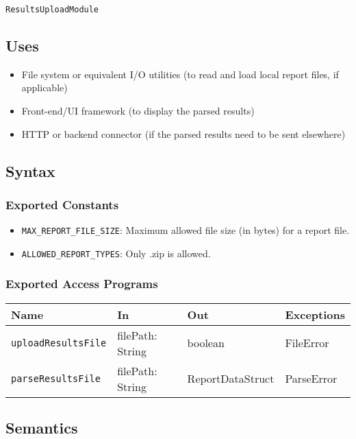 \documentclass[12pt, titlepage]{article}
\begin{document}
\texttt{ResultsUploadModule}

\subsection{Uses}

\begin{itemize}
    \item File system or equivalent I/O utilities (to read and load local report files, if applicable)
    \item Front-end/UI framework (to display the parsed results)
    \item HTTP or backend connector (if the parsed results need to be sent elsewhere)
\end{itemize}

\subsection{Syntax}

\subsubsection{Exported Constants}

\begin{itemize}
    \item \texttt{MAX\_REPORT\_FILE\_SIZE}: Maximum allowed file size (in bytes) for a report file.
    \item \texttt{ALLOWED\_REPORT\_TYPES}: Only .zip is allowed.
\end{itemize}

\subsubsection{Exported Access Programs}

\begin{center}
\begin{tabular}{p{5cm} p{3.5cm} p{3.5cm} p{2cm}}
\hline
\textbf{Name} & \textbf{In} & \textbf{Out} & \textbf{Exceptions} \\
\hline
\texttt{uploadResultsFile} & filePath: String & boolean & FileError \\
\texttt{parseResultsFile} & filePath: String & ReportDataStruct & ParseError \\
\hline
\end{tabular}
\end{center}

\subsection{Semantics}
\end{document}
